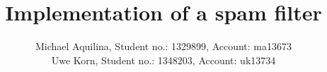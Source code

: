 \documentclass[12pt,journal]{IEEEtran}
\begin{document}
\newcommand{\todo}[1]{{\color{red} #1}}

\title{Implementation of a spam filter}
\author{Michael Aquilina, Student no.: 1329899, Account: ma13673 \\
    Uwe Korn, Student no.: 1348203, Account: uk13734}
\maketitle
\IEEEpeerreviewmaketitle













\end{document}
